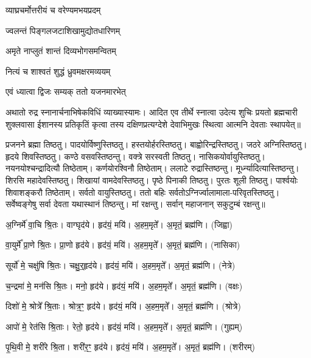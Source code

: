 {व्याघ्रचर्मोत्तरीयं च वरेण्यमभयप्रदम्}

{ज्वलन्तं पिङ्गलजटाशिखामुद्योतधारिणम्}

{अमृते नाप्लुतं शान्तं दिव्यभोगसमन्वितम्}

{नित्यं च शाश्वतं शुद्धं ध्रुवमक्षरमव्ययम्}

{एवं ध्यात्वा द्विजः सम्यक् ततो यजनमारभेत्}

अथातो रुद्र स्नानार्चनाभिषेकविधिं व्याख्यास्यामः। आदित एव तीर्थे स्नात्वा उदेत्य शुचिः
प्रयतो ब्रह्मचारी शुक्लवासा ईशानस्य प्रतिकृतिं कृत्वा तस्य दक्षिणप्रत्यग्देशे देवाभिमुखः स्थित्वा आत्मनि देवताः स्थापयेत्॥

प्रजनने ब्रह्मा तिष्ठतु। पादयोर्विष्णुस्तिष्ठतु।
हस्तयोर्हरस्तिष्ठतु। बाह्वोरिन्द्रस्\-तिष्ठतु।
जठरे अग्निस्तिष्ठतु। हृदये शिवस्तिष्ठतु।
कण्ठे वसवस्तिष्ठन्तु। वक्त्रे सरस्वती तिष्ठतु।
नासिकयोर्\-वायुस्तिष्ठतु। नयनयोश्चन्द्रा\-दित्यौ तिष्ठेताम्।
कर्णयोरश्विनौ तिष्ठेताम्। ललाटे रुद्रास्तिष्ठन्तु।
मूर्ध्न्यादित्यास्तिष्ठन्तु। शिरसि महादेवस्तिष्ठतु।
शिखायां वामदेवस्तिष्ठतु। पृष्ठे पिनाकी तिष्ठतु।
पुरतः शूली तिष्ठतु। पार्श्वयोः शिवाशङ्करौ तिष्ठेताम्।
सर्वतो वायुस्तिष्ठतु। ततो बहिः सर्वतोऽग्निर्ज्वालामाला-परिवृतस्तिष्ठतु।
सर्वेष्वङ्गेषु सर्वा देवता यथास्थानं तिष्ठन्तु। मां रक्षन्तु।
\lbrack सर्वान् महाजनान् सकुटुम्बं रक्षन्तु॥\rbrack

अ॒ग्निर्मे॑ वा॒चि श्रि॒तः। वाग्घृद॑ये। हृद॑यं॒ मयि॑। अ॒हम॒मृते᳚। अ॒मृतं॒ ब्रह्म॑णि। (जिह्वा)

वा॒युर्मे᳚ प्रा॒णे श्रि॒तः। प्रा॒णो हृद॑ये। हृद॑यं॒ मयि॑। अ॒हम॒मृते᳚। अ॒मृतं॒ ब्रह्म॑णि। (नासिका)

  सूर्यो॑ मे॒ चक्षु॑षि श्रि॒तः। चक्षु॒र्‌॒हृद॑ये। हृद॑यं॒ मयि॑। अ॒हम॒मृते᳚। अ॒मृतं॒ ब्रह्म॑णि। (नेत्रे)

  च॒न्द्रमा॑ मे॒ मन॑सि श्रि॒तः। मनो॒ हृद॑ये। हृद॑यं॒ मयि॑। अ॒हम॒मृते᳚। अ॒मृतं॒ ब्रह्म॑णि। (वक्षः)

  दिशो॑ मे॒ श्रोत्रे᳚ श्रि॒ताः। श्रोत्र॒ꣳ॒ हृद॑ये। हृद॑यं॒ मयि॑। अ॒हम॒मृते᳚। अ॒मृतं॒ ब्रह्म॑णि। (श्रोत्रे)

  आपो॑ मे॒ रेत॑सि श्रि॒ताः। रेतो॒ हृद॑ये। हृद॑यं॒ मयि॑। अ॒हम॒मृते᳚। अ॒मृतं॒ ब्रह्म॑णि। (गुह्यम्)

  पृ॒थि॒वी मे॒ शरी॑रे श्रि॒ता। शरी॑र॒ꣳ॒ हृद॑ये। हृद॑यं॒ मयि॑। अ॒हम॒मृते᳚। अ॒मृतं॒ ब्रह्म॑णि। (शरीरम्)

